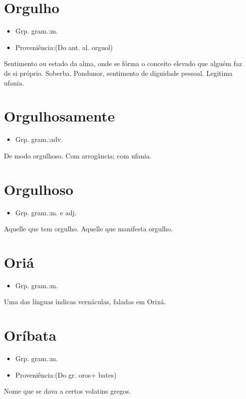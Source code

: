\section{Orgulho}
\begin{itemize}
\item {Grp. gram.:m.}
\end{itemize}
\begin{itemize}
\item {Proveniência:(Do ant. al. \textunderscore orguol\textunderscore )}
\end{itemize}
Sentimento ou estado da alma, onde se fórma o conceito elevado que alguém faz de si próprio.
Soberba.
Pondunor, sentimento de dignidade pessoal.
Legitima ufania.
\section{Orgulhosamente}
\begin{itemize}
\item {Grp. gram.:adv.}
\end{itemize}
De modo orgulhoso.
Com arrogância; com ufania.
\section{Orgulhoso}
\begin{itemize}
\item {Grp. gram.:m.  e  adj.}
\end{itemize}
Aquelle que tem orgulho.
Aquelle que manifesta orgulho.
\section{Oriá}
\begin{itemize}
\item {Grp. gram.:m.}
\end{itemize}
Uma das línguas índicas vernáculas, faladas em Orixá.
\section{Oríbata}
\begin{itemize}
\item {Grp. gram.:m.}
\end{itemize}
\begin{itemize}
\item {Proveniência:(Do gr. \textunderscore oros\textunderscore  + \textunderscore bates\textunderscore )}
\end{itemize}
Nome que se dava a certos volatins gregos.
